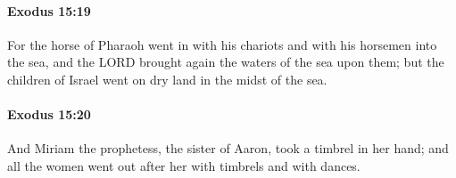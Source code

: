 		\paragraph{Exodus 15:19} %
			\label{EXODUS-15-19}

			For the horse of Pharaoh went in with his chariots and with his horsemen into the sea, and the LORD brought again the waters of the sea upon them; but the children of Israel went on dry land in the midst of the sea.


		\paragraph{Exodus 15:20} %
			\label{EXODUS-15-20}

			And Miriam the prophetess, the sister of Aaron, took a timbrel in her hand; and all the women went out after her with timbrels and with dances.



